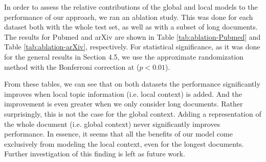 \begin{table}[htb!]
    \centering
    \caption[Ablation study on Pubmed]{Ablation study on arXiv dataset, with all documents (up) and a subset of long document(down, $>9000$ words).  Results that are not significantly different from the best systems are in bold.}
    \label{tab:ablation-arXiv}
\end{table}

In order to  assess  the relative  contributions  of  the  global  and  local models to the performance of our approach, we ran an ablation study. This was done for each dataset both with the whole test set, as well as with a subset of long documents. The results for Pubmed and arXiv are shown in  
 Table \ref{tab:ablation-Pubmed} and Table \ref{tab:ablation-arXiv}, respectively. For statistical significance, as it was done for the general results in Section 4.5, we use the approximate randomization method \cite{statsig} with the Bonferroni correction at ($p<0.01$). 

From these tables, we can see that on both datasets the performance significantly improves when local topic information (i.e. local context) is added. And the improvement is even greater when we only consider long documents. Rather surprisingly,  this is not the case for the global context. Adding a representation of the whole document (i.e. global context) never significantly improves performance. In essence, it seems that all the  benefits of our model come exclusively from modeling  the  local  context,  even  for  the  longest documents. Further investigation of this finding is left as future work.

